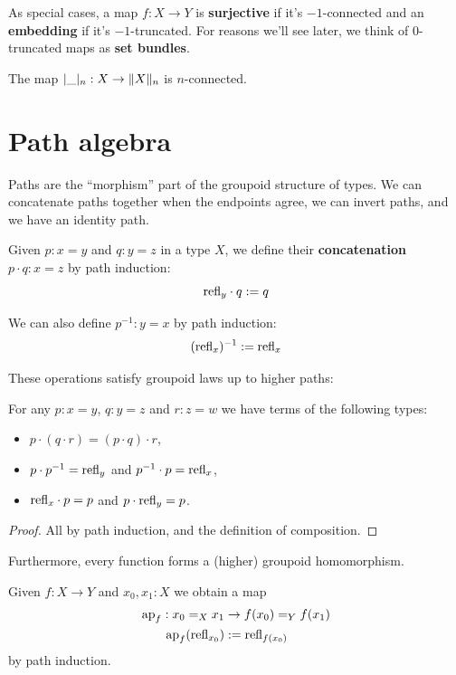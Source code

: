 \documentclass[10pt,oneside,leqno,openright]{memoir}
\begin{document}
As special cases, a map $f:X\to Y$ is \textbf{surjective} if it's $-1$-connected
and an \textbf{embedding} if it's $-1$-truncated. For reasons we'll see later, we think of $0$-truncated maps as \textbf{set bundles}.
\begin{example}
    The map $\lvert\_\rvert_n : X \to \lVert X\rVert_n$ is $n$-connected.
\end{example}

\section{Path algebra}

Paths are the ``morphism'' part of the groupoid structure of types.
We can concatenate paths together when the endpoints agree, we can invert paths, and we have an identity path.

\begin{definition}
    Given $p : x = y$ and $q :  y = z$ in a type $X$, we define their \textbf{concatenation} $p \cdot q : x = z$ by path induction:
    \[  \mathrm{refl}_y \cdot q := q \]

    We can also define $p^{-1} : y = x$ by path induction:
    \[ (\mathrm{refl}_x)^{-1} := \mathrm{refl}_x \]
\end{definition}

These operations satisfy groupoid laws up to higher paths:
\begin{lemma}
    For any $p : x = y$, $q : y = z$ and $r : z = w$ we have terms of the following types:
    \begin{itemize}
        \item $p \cdot (q \cdot r) = (p \cdot q) \cdot r$,
        \item $p \cdot p^{-1} = \mathrm{refl}_y$ and $p^{-1} \cdot p = \mathrm{refl}_x$,
        \item $\mathrm{refl}_x \cdot p = p$ and $p \cdot \mathrm{refl}_y = p$.
    \end{itemize}
\end{lemma}
\begin{proof}
    All by path induction, and the definition of composition.
\end{proof}

Furthermore, every function forms a (higher) groupoid homomorphism.
\begin{definition}
    Given $f : X \to Y$ and $x_0, x_1 : X$ we obtain a map
    \begin{align*}
        \operatorname{ap}_f : x_0 =_X x_1 &\to f(x_0) =_Y f(x_1) \\
        \operatorname{ap}_f(\mathrm{refl}_{x_0}) &:= \mathrm{refl}_{f(x_0)}
    \end{align*}
    by path induction.
\end{definition}
\end{document}
